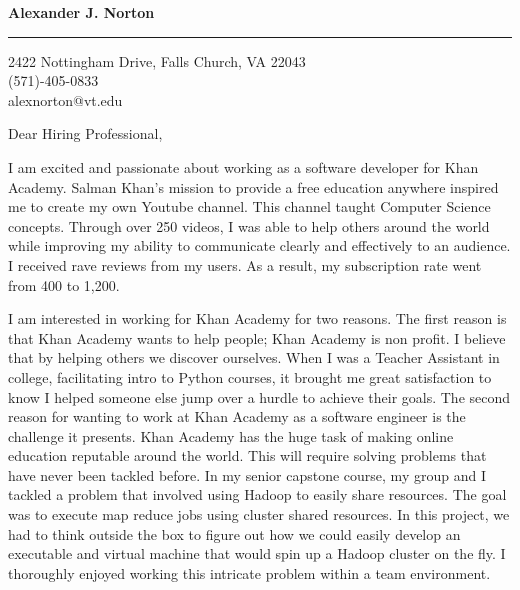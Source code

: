 \documentclass{letter} %
\begin{document}
\signature{Alexander J. Norton}           %
\longindentation=0pt                       %
\let\raggedleft\raggedright                %
 
 
\begin{letter}{}


\begin{flushleft}
{\large\bf Alexander J. Norton}
\end{flushleft}
\medskip\hrule height 1pt
\begin{flushright}
\hfill 2422 Nottingham Drive, Falls Church, VA 22043 \\
\hfill (571)-405-0833\\
\hfill alexnorton@vt.edu 
\end{flushright} 

\opening{Dear Hiring Professional,} 
 


\noindent I am excited and passionate about working as a 
software developer for Khan Academy.  Salman Khan's mission to provide a free education
anywhere inspired me to create my own Youtube channel.  This channel taught Computer Science concepts.  Through over 250 videos, I was able to help others around the world while improving my ability to 
communicate clearly and effectively to an audience.  I received rave reviews from my users.  As a result, my subscription rate went from 400 to 1,200.

 \noindent I am interested in working for Khan Academy for two reasons.  The first reason is that Khan Academy wants to help people; Khan Academy is non profit.  I believe that by helping others we discover ourselves.  When I was a Teacher Assistant in college, facilitating intro to Python courses, it brought me great satisfaction to know I helped someone else jump over a hurdle to achieve their goals.  The second reason for wanting to work at Khan Academy as a software engineer is the challenge it presents.  Khan Academy has the huge task of making online education reputable around the world.  This will require solving problems that have never been tackled before.  In my senior capstone course, my group and I tackled a problem that involved using Hadoop to easily share resources.  The goal was to execute map reduce jobs using cluster shared resources.  In this project, we had to think outside the box to figure out how we could easily develop an executable and virtual machine that would spin up a Hadoop cluster on the fly.  I thoroughly enjoyed working this intricate problem within a team environment.  



\end{letter}
\end{document}
